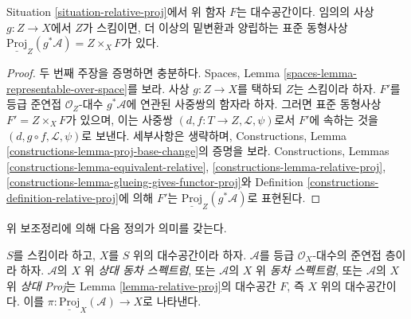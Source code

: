 \begin{lemma}
\label{lemma-relative-proj}
Situation \ref{situation-relative-proj}에서 위 함자 $F$는 대수공간이다.
임의의 사상 $g : Z \to X$에서 $Z$가 스킴이면, 더 이상의 밑변환과
양립하는 표준 동형사상
$\underline{\text{Proj}}_Z(g^*\mathcal{A}) = Z \times_X F$가 있다.
\end{lemma}

\begin{proof}
두 번째 주장을 증명하면 충분하다. Spaces, Lemma
\ref{spaces-lemma-representable-over-space}를 보라.
사상 $g : Z \to X$를 택하되 $Z$는 스킴이라 하자. $F'$를 등급 준연접
$\mathcal{O}_Z$-대수 $g^*\mathcal{A}$에 연관된 사중쌍의 함자라 하자.
그러면 표준 동형사상 $F' = Z \times_X F$가 있으며, 이는 사중쌍
$(d, f : T \to Z, \mathcal{L}, \psi)$로서 $F'$에 속하는 것을
$(d, g \circ f, \mathcal{L}, \psi)$로 보낸다. 세부사항은 생략하며,
Constructions, Lemma \ref{constructions-lemma-proj-base-change}의 증명을
보라. Constructions, Lemmas
\ref{constructions-lemma-equivalent-relative},
\ref{constructions-lemma-relative-proj},
\ref{constructions-lemma-glueing-gives-functor-proj}와
Definition \ref{constructions-definition-relative-proj}에 의해 $F'$는
$\underline{\text{Proj}}_Z(g^*\mathcal{A})$로 표현된다.
\end{proof}

\noindent
위 보조정리에 의해 다음 정의가 의미를 갖는다.

\begin{definition}
\label{definition-relative-proj}
$S$를 스킴이라 하고, $X$를 $S$ 위의 대수공간이라 하자.
$\mathcal{A}$를 등급 $\mathcal{O}_X$-대수의 준연접 층이라 하자.
$\mathcal{A}$의 $X$ 위 {\it 상대 동차 스펙트럼}, 또는
$\mathcal{A}$의 $X$ 위 {\it 동차 스펙트럼}, 또는
$\mathcal{A}$의 $X$ 위 {\it 상대 Proj}는 Lemma
\ref{lemma-relative-proj}의 대수공간 $F$, 즉 $X$ 위의 대수공간이다. 이를
$\pi : \underline{\text{Proj}}_X(\mathcal{A}) \to X$로 나타낸다.
\end{definition}

